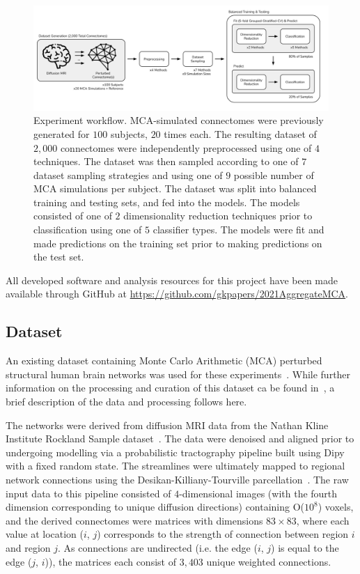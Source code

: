 \documentclass[10pt]{SelfArx} %
\newcommand{\new}[1]{\color{blue}#1\color{black}\xspace}
\begin{document}
\begin{figure}[bth!]\centering
\includegraphics[width=\linewidth]{figures/0.pdf}
\caption{Experiment workflow. MCA-simulated connectomes were previously generated for $100$ subjects, $20$ times each.
The resulting dataset of $2,000$ connectomes were independently preprocessed using one of $4$ techniques. The dataset
was then sampled according to one of $7$ dataset sampling strategies and using one of $9$ possible number of MCA
simulations per subject. The dataset was split into balanced training and testing sets, and fed into the models. The
models consisted of one of $2$ dimensionality reduction techniques prior to classification using one of $5$ classifier
types. The models were fit and made predictions on the training set prior to making predictions on the test set.}
\label{fig:workflow}
\end{figure}

All developed software and analysis resources for this project have been made available through GitHub at
\url{https://github.com/gkpapers/2021AggregateMCA}.

\subsection*{Dataset}

An existing dataset containing Monte Carlo Arithmetic (MCA) perturbed structural human brain networks was used for
these experiments~\cite{Kiar2020-yz}. \new{While further information on the processing and curation of this dataset ca
be found in~\cite{Kiar2020-kz}, a brief description of the data and processing follows here.}

\new{The networks were derived from diffusion MRI data from the Nathan Kline Institute Rockland Sample
dataset~\cite{zuo2014open}. The data were denoised and aligned prior to undergoing modelling via a probabilistic
tractography pipeline built using Dipy~\cite{Garyfallidis2014-ql} with a fixed random state. The streamlines were
ultimately mapped to regional network connections using the Desikan-Killiany-Tourville
parcellation~\cite{Klein2012-vi}. The raw input data to this pipeline consisted of $4$-dimensional images (with the 
fourth dimension corresponding to unique diffusion directions) containing O($10^8$) voxels, and the derived
connectomes were matrices with dimensions $83 \times 83$, where each value at location ($i$, $j$) corresponds to the
strength of connection between region $i$ and region $j$. As connections are undirected (i.e. the edge ($i$, $j$) is
equal to the edge ($j$, $i$)), the matrices each consist of $3,403$ unique weighted connections.}
\end{document}
